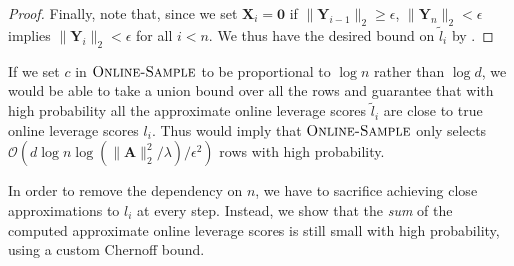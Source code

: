 \documentclass{toc}
\newcommand{\Oh}{\ensuremath{\mathcal{O}}}
\newcommand{\bv}[1]{\mathbf{#1}}
\newcommand{\norm}[1]{\|#1\|}
\begin{document}
\begin{proof}
Finally, note that, since we set $\bv{X}_i = \bv{0}$ if $\norm{\bv{Y}_{i-1}}_2 \ge \epsilon$, $\norm{\bv{Y}_n}_2 < \epsilon$ implies $\norm{\bv{Y}_i}_2 < \epsilon$ for all $i < n$. We thus have the desired bound on $\tilde{l}_i$ by .
\end{proof}

If we set $c$ in $\textsc{Online-Sample}$ to be proportional to $\log n$ rather than $\log d$, we would be able to take a union bound over all the rows and guarantee that with high probability all the approximate online leverage scores $\tilde{l}_i$ are close to true online leverage scores $l_i$.
Thus  would imply that $\textsc{Online-Sample}$ only selects  $\Oh(d\log n \log(\|\bv{A}\|_2^2 / \lambda)/\epsilon^2)$ rows with high probability.

In order to remove the dependency on $n$, we have to sacrifice achieving close approximations to $l_i$ at every step.
Instead, we show that the \emph{sum} of the computed approximate online leverage scores is still small with high probability, using a custom Chernoff bound.
\end{document}
